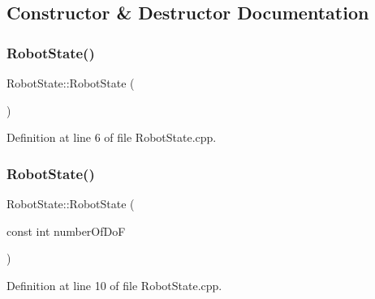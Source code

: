 \subsection{Constructor \& Destructor Documentation}
\hypertarget{classocra__recipes_1_1RobotState_ad10e75019e308bb0be22aa545eab0c44}{}\label{classocra__recipes_1_1RobotState_ad10e75019e308bb0be22aa545eab0c44} 
\subsubsection{\texorpdfstring{Robot\+State()}{RobotState()}\hspace{0.1cm}{\footnotesize\ttfamily [1/2]}}
{\footnotesize\ttfamily Robot\+State\+::\+Robot\+State (\begin{DoxyParamCaption}{ }\end{DoxyParamCaption})}



Definition at line 6 of file Robot\+State.\+cpp.

\hypertarget{classocra__recipes_1_1RobotState_ae6462774d46dadc364bc936f61bde768}{}\label{classocra__recipes_1_1RobotState_ae6462774d46dadc364bc936f61bde768} 
\subsubsection{\texorpdfstring{Robot\+State()}{RobotState()}\hspace{0.1cm}{\footnotesize\ttfamily [2/2]}}
{\footnotesize\ttfamily Robot\+State\+::\+Robot\+State (\begin{DoxyParamCaption}\item[{const int}]{number\+Of\+DoF }\end{DoxyParamCaption})}



Definition at line 10 of file Robot\+State.\+cpp.

\hypertarget{classocra__recipes_1_1RobotState_a86cf2dc3aef7d924f89d5b3e5467ea8a}{}\label{classocra__recipes_1_1RobotState_a86cf2dc3aef7d924f89d5b3e5467ea8a} 
